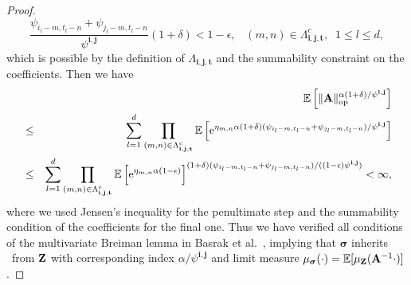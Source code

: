 \begin{proof}
$$\frac{\psi_{i_l-m,t_l-n}+\psi_{j_l-m,t_l-n}}{\psi^{\mathbf{i},\mathbf{j}}}(1+\delta)<1-\epsilon, \;\;\;  (m,n) \in \Lambda_{\mathbf{i},\mathbf{j},\mathbf{t}}^c,\;\;1\leq l \leq d,$$
which is possible by the definition of $\Lambda_{\mathbf{i},\mathbf{j},\mathbf{t}}$ and the summability constraint on the coefficients. Then we have 
\begin{eqnarray*}&&{\mathbb E}\left[\|\mathbf{A}\|_{\mbox{\scriptsize op}}^{\alpha(1+\delta)/\psi^{\mathbf{i},\mathbf{j}}}\right]\\
&\leq & \sum_{l=1}^d \prod\limits_{(m,n) \in \Lambda_{\mathbf{i},\mathbf{j},\mathbf{t}}^c} {\mathbb E}\left[{\rm e}^{\eta_{m,n}\alpha(1+\delta)(\psi_{i_l-m,t_l-n}+\psi_{j_l-m,t_l-n})/\psi^{\mathbf{i},\mathbf{j}}}\right]\\
&\leq& \sum_{l=1}^d \prod\limits_{(m,n) \in \Lambda_{\mathbf{i},\mathbf{j},\mathbf{t}}^c} {\mathbb E}\left[{\rm e}^{\eta_{m,n}\alpha(1-\epsilon)}\right]^{(1+\delta)(\psi_{i_l-m,t_l-n}+\psi_{j_l-m,t_l-n})/((1-\epsilon)\psi^{\mathbf{i},\mathbf{j}})} <\infty,
\end{eqnarray*}
where we used Jensen's inequality for the penultimate step and the 
summability condition of the coefficients for the final one. Thus we have verified all conditions of the 
multivariate Breiman lemma in Basrak et al.~\cite{basrak:davis:mikosch:2002a}, implying that
$\boldsymbol{\sigma}$ inherits \regvar\  from ${\bf Z}$ with corresponding
index $\alpha/\psi^{\mathbf{i},\mathbf{j}}$ and limit measure
$\mu_{\boldsymbol{\sigma}}(\cdot)={\mathbb E}[\mu_{\mathbf{Z}}(\mathbf{A}^{-1}\cdot)]$.
\end{proof}
